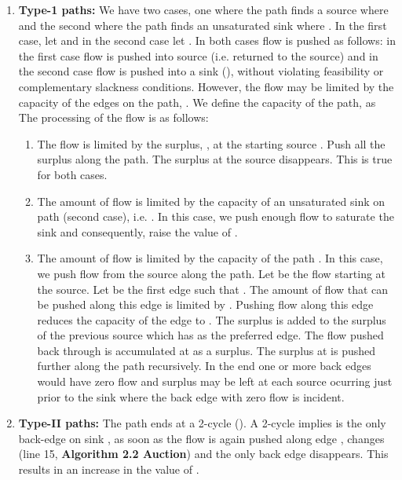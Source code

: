 \documentclass[11pt]{article}
\begin{document}
\begin{enumerate}
\item
{\bf Type-1 paths:} We have two cases, one
where the path finds a  source  where  and the second where
the path finds  an unsaturated sink  where . 
In the first case, let 
and in the second case let . 
In both cases flow is pushed as follows: in the first
case flow is pushed into 
source  (i.e. returned to the source) and in the second
case flow is pushed into a sink (), 
without violating feasibility or complementary slackness conditions. 
However, the flow may be limited by the capacity of the edges on the path, .
We define the capacity of the path,  
as 
The processing of the flow is as follows:
\begin{enumerate}
\item
The flow is limited by the surplus, , 
at the starting source . Push all the surplus
along the path. The surplus at the source disappears.
This is true for both  cases.

\item
The amount of flow is limited by the capacity of an unsaturated sink on 
path  (second case), i.e. . 
In this case, we push enough
flow to saturate the sink and consequently, raise the value of . 

\item
The amount of flow is limited by the capacity of  the path .
In this case, we push flow  from the source along 
the path. Let  be the flow starting at the source.
Let  be the first edge such that .
The amount of flow that can be pushed along this edge is limited by .
Pushing flow along this edge reduces  the capacity of the edge   to .
The surplus   is added to the surplus of the previous source  
which has  as the preferred
edge. 
The flow pushed back through  is accumulated at  as a surplus.
The surplus at   is pushed  further along the path recursively. 
In the end one or more back edges would have zero flow and surplus may be left at
each source ocurring just prior to the sink where the back edge with zero flow is incident.


\end{enumerate}

\item
{\bf Type-II paths:}
The path ends at a 2-cycle ().
A  2-cycle implies  is the only back-edge on sink , as soon as the flow
is again pushed along edge ,  changes 
(line 15, {\bf Algorithm 2.2  Auction}) and the only back edge disappears. 
This results in an increase in the value of .


\end{enumerate}
\end{document}
